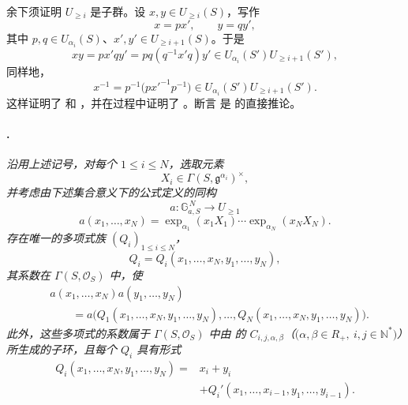 余下须证明 \(U_{\geq i}\) 是子群。设 \(x,y\in U_{\geq i}(S)\)，写作
\[
  x=px',\qquad y=qy',
\]
其中 \(p,q\in U_{\alpha_i}(S)\)、\(x',y'\in U_{\geq i+1}(S)\)。于是
\[
  xy=px'qy'=pq(q^{-1}x'q)y'
  \in U_{\alpha_i}(S')U_{\geq i+1}(S'),
\]
同样地，
\[
  x^{-1}
  =
  p^{-1}\bigl(p{x'}^{-1}p^{-1}\bigr)
  \in U_{\alpha_i}(S')U_{\geq i+1}(S').
\]
这样证明了 \textup{} 和 \textup{}，并在过程中证明了 \textup{}。断言 \textup{} 是  的直接推论。

\paragraph{.}
\textit{沿用上述记号，对每个 \(1\leq i\leq N\)，选取元素}
\[
  X_i\in\Gamma(S,\mathfrak g^{\alpha_i})^\times,
\]
\textit{并考虑由下述集合意义下的公式定义的同构}
\[
  a:\mathbb G_{a,S}^{\,N}\longrightarrow U_{\geq1}
\]
\[
  a(x_1,\ldots,x_N)
  =
  \exp_{\alpha_1}(x_1X_1)\cdots
  \exp_{\alpha_N}(x_NX_N).
\]
\textit{存在唯一的多项式族 \((Q_i)_{1\leq i\leq N}\)，}
\[
  Q_i
  =
  Q_i(x_1,\ldots,x_N,y_1,\ldots,y_N),
\]
\textit{其系数在 \(\Gamma(S,\mathcal O_S)\) 中，使}
\[
\begin{split}
  &a(x_1,\ldots,x_N)a(y_1,\ldots,y_N)\\
  &\qquad =
  a\bigl(
    Q_1(x_1,\ldots,x_N,y_1,\ldots,y_N),
    \ldots,
    Q_N(x_1,\ldots,x_N,y_1,\ldots,y_N)
  \bigr).
\end{split}
\]
\textit{此外，这些多项式的系数属于 \(\Gamma(S,\mathcal O_S)\) 中由  的 \(C_{i,j,\alpha,\beta}\)（\(\bigl(\alpha,\beta\in R_+,\ i,j\in\mathbb N^*\bigr)\)）所生成的子环，且每个 \(Q_i\) 具有形式}
\[
\begin{split}
  Q_i(x_1,\ldots,x_N,y_1,\ldots,y_N)
  ={}&x_i+y_i\\
  &+
  Q_i'(x_1,\ldots,x_{i-1},y_1,\ldots,y_{i-1}).
\end{split}
\]

